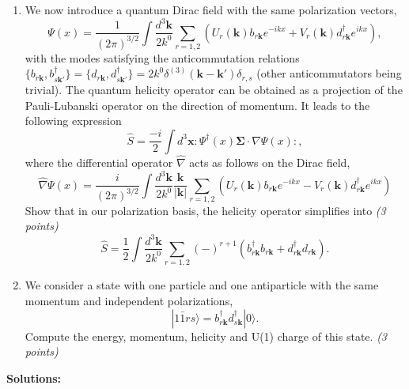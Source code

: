 \begin{enumerate}
    \item We now introduce a quantum Dirac field with the same polarization vectors,
    \begin{equation}
        \Psi(x) = \frac{1}{(2\pi)^{3/2}} \int \frac{d^3\mathbf{k}}{2k^0} \sum_{r=1,2} (U_r(\mathbf{k})b_{r\mathbf{k}}e^{-ikx} + V_r(\mathbf{k})d^\dagger_{r\mathbf{k}}e^{ikx}),
    \end{equation}
    with the modes satisfying the anticommutation relations $\{b_{r\mathbf{k}}, b^\dagger_{s\mathbf{k}'}\} = \{d_{r\mathbf{k}}, d^\dagger_{s\mathbf{k}'}\} = 2k^0\delta^{(3)}(\mathbf{k}-\mathbf{k}')\delta_{r,s}$ (other anticommutators being trivial). The quantum helicity operator can be obtained as a projection of the Pauli-Lubanski operator on the direction of momentum. It leads to the following expression
    \begin{equation}
        \hat{S} = \frac{-i}{2} \int d^3\mathbf{x} : \Psi^\dagger(x) \boldsymbol{\Sigma} \cdot \hat{\nabla} \Psi(x) :,
    \end{equation}
    where the differential operator $\hat{\nabla}$ acts as follows on the Dirac field,
    \begin{equation}
        \hat{\nabla} \Psi(x) = \frac{i}{(2\pi)^{3/2}} \int \frac{d^3\mathbf{k}}{2k^0} \frac{\mathbf{k}}{|\mathbf{k}|} \sum_{r=1,2} (U_r(\mathbf{k})b_{r\mathbf{k}}e^{-ikx} - V_r(\mathbf{k})d^\dagger_{r\mathbf{k}}e^{ikx})
    \end{equation}
    Show that in our polarization basis, the helicity operator simplifies into \textit{(3 points)}
    \begin{equation}
        \hat{S} = \frac{1}{2} \int \frac{d^3\mathbf{k}}{2k^0} \sum_{r=1,2} (-)^{r+1} (b^\dagger_{r\mathbf{k}}b_{r\mathbf{k}} + d^\dagger_{r\mathbf{k}}d_{r\mathbf{k}}).
    \end{equation}

    \item We consider a state with one particle and one antiparticle with the same momentum and independent polarizations,
    \begin{equation}
        |1\bar{1}rs\rangle = b^\dagger_{r\mathbf{k}} d^\dagger_{s\mathbf{k}} |0\rangle.
    \end{equation}
    Compute the energy, momentum, helicity and U(1) charge of this state. \textit{(3 points)}
\end{enumerate}

\textbf{Solutions:}

